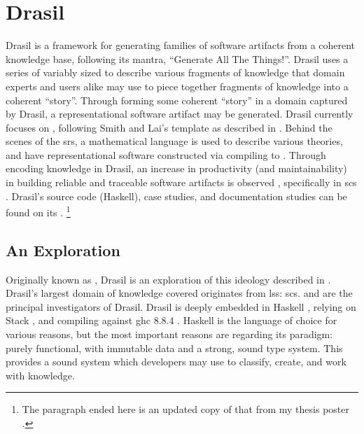 \chapter{Drasil}
\label{chap:drasil}


Drasil is a framework for generating families of software artifacts from a
coherent knowledge base, following its mantra, ``Generate All The Things!''.
Drasil uses a series of variably sized  to describe various fragments
of knowledge that domain experts and users alike may use to piece together
fragments of knowledge into a coherent ``story''. Through forming some coherent
``story'' in a domain captured by Drasil, a representational software artifact
may be generated. Drasil currently focuses on , following Smith and
Lai's  template as described in \cite{SmithAndLai2005}. Behind the
scenes of the \acs{srs}, a mathematical language is used to describe various
theories, and have representational software constructed via compiling to
 \cite{Carette2019}. Through encoding knowledge in Drasil, an increase
in productivity (and maintainability) in building reliable and traceable
software artifacts is observed \cite{SzymczakEtAl2016}, specifically in
\acs{scs} \cite{Smith2018}. Drasil's source code (Haskell), case studies, and
documentation studies can be found on its
. \footnote{The
paragraph ended here is an updated copy of that from my thesis poster
\cite{Balaci2021Poster}.}

\section{An Exploration}

Originally known as , Drasil is an exploration of this ideology
described in . Drasil's largest domain of knowledge
covered originates from \acs{lss}: \acl{scs}.  and  are the principal
investigators of Drasil. Drasil is deeply embedded in Haskell
\cite{Haskell2010}, relying on Stack \cite{HaskellStack}, and compiling
against \acs{ghc} 8.8.4 \cite{GHC884}. Haskell is the language of choice
for various reasons, but the most important reasons are regarding its
paradigm: purely functional, with immutable data and a strong, sound type
system. This provides a sound system which developers may use to classify,
create, and work with knowledge.

